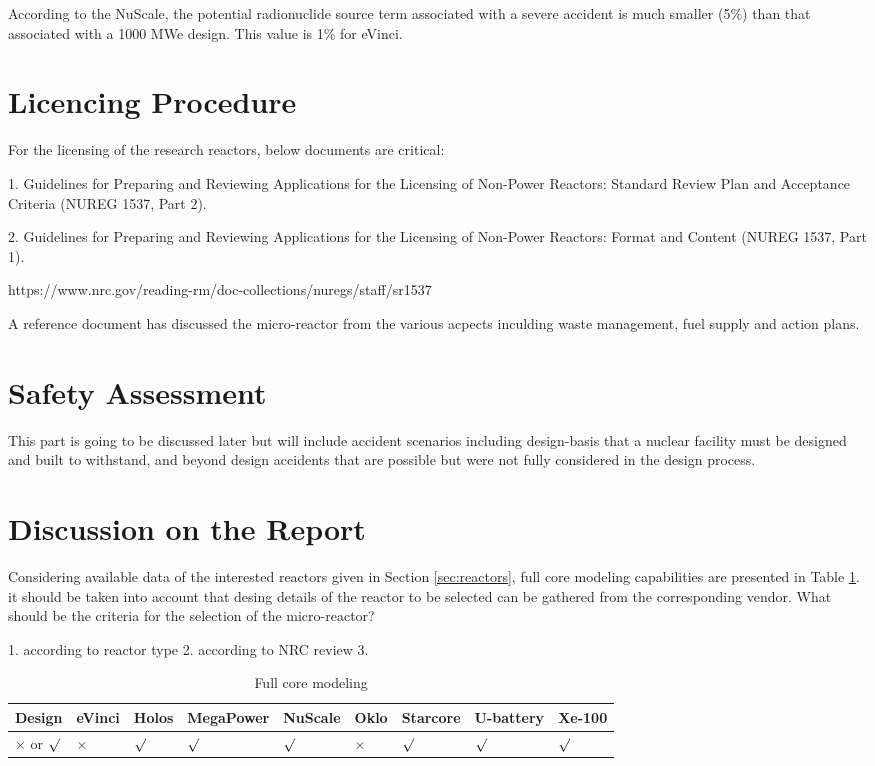 \documentclass[10pt,a4paper]{article}
\begin{document}
According to the NuScale, the potential radionuclide source term associated with a severe accident is much smaller (5\%) than that associated with a 1000 MWe design. This value is 1\% for eVinci. 

\pagebreak
\section{Licencing Procedure}
For the licensing of the research reactors, below documents are critical:

1. Guidelines for Preparing and Reviewing Applications for the Licensing of Non-Power Reactors: Standard Review Plan and Acceptance Criteria (NUREG 1537, Part 2).

2. Guidelines for Preparing and Reviewing Applications for the Licensing of Non-Power Reactors: Format and Content (NUREG 1537, Part 1). 


https://www.nrc.gov/reading-rm/doc-collections/nuregs/staff/sr1537

A reference document \cite{nichol18} has discussed  the micro-reactor from the various acpects inculding waste management, fuel supply and action plans.


\section{Safety Assessment}
This part is going to be discussed later but will include accident scenarios including design-basis that a nuclear facility must be designed and built to withstand, and beyond design accidents that are possible but were not fully considered in the design process.

\section{Discussion on the Report}

Considering available data of the interested reactors given in Section \ref{sec:reactors}, full core modeling capabilities are presented in Table \ref{table:feasiblity}. it should be taken into account that desing details of the reactor to be selected can be gathered from the corresponding vendor. What should be the criteria for the selection of the micro-reactor?

1. according to reactor type
2. according to NRC review
3. 

\begin{table} [ht]
\begin{center}

\caption{Full core modeling}
\label{table:feasiblity}
\begin{tabular}{|l|l|l|l|l|l|l|l|l|}
\hline 
Design 		&eVinci 		& Holos		&MegaPower 	& NuScale		& Oklo 		& Starcore		& U-battery 		& Xe-100 \\ 
\hline 
$\times$ or 	$\surd$ 		&  $\times$		& $\surd$		& $\surd$ 	&   $\surd$		&  $\times$		& $\surd$	&  $\surd$ 		&  $\surd$ \\ 
\hline 

\end{tabular}
\end{center}
\end{table}
\end{document}
